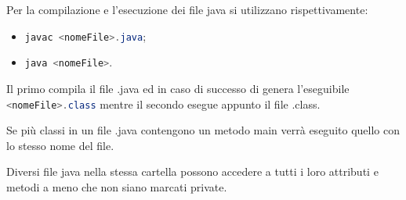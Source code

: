 \documentclass{subfile}
\begin{document}
    Per la compilazione e l'esecuzione dei file java si utilizzano rispettivamente:
    \begin{itemize}
        \item \lstinline[language = java]{javac <nomeFile>.java};
        \item \lstinline[language = java]{java <nomeFile>}.
    \end{itemize}
    Il primo compila il file .java ed in caso di successo di genera l'eseguibile \lstinline[language = java]{<nomeFile>.class} 
    mentre il secondo esegue appunto il file .class.

    \begin{Note*}
         Se più classi in un file .java contengono un metodo main verrà eseguito quello con lo stesso nome del file.
    \end{Note*}
    Diversi file java nella stessa cartella possono accedere a tutti i loro attributi e metodi a meno che non siano marcati
    private.
\end{document}
